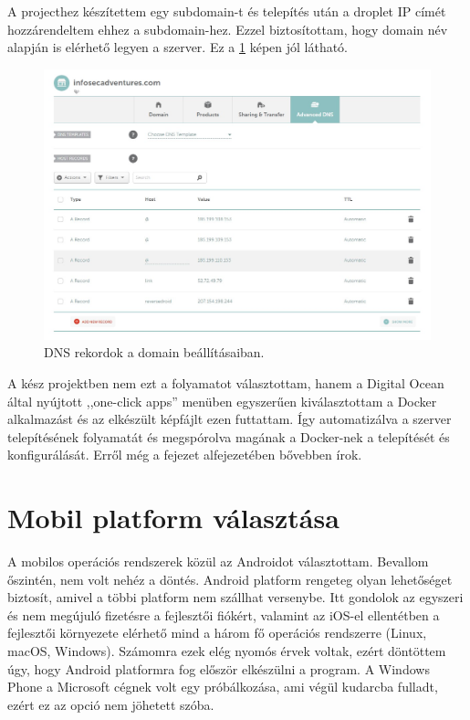 \documentclass{thesis-ekf}
\theoremstyle{definition}
\theoremstyle{remark}
\begin{document}
A projecthez készítettem egy subdomain-t és telepítés után a droplet IP címét hozzárendeltem ehhez a subdomain-hez.
Ezzel biztosítottam, hogy domain név alapján is elérhető legyen a szerver. Ez a \ref{namecheap} képen jól látható.

\begin{figure}[!h]
	\centering
	\includegraphics[width=15cm]{pictures/namecheap}
	\caption{DNS rekordok a domain beállításaiban.}
	\label{namecheap}
\end{figure}

A kész projektben nem ezt a folyamatot választottam, hanem a Digital Ocean által nyújtott ,,one-click apps'' menüben egyszerűen kiválasztottam a Docker alkalmazást és az elkészült képfájlt ezen futtattam. 
Így automatizálva a szerver telepítésének folyamatát és megspórolva magának a Docker-nek a telepítését és konfigurálását.
Erről még a  fejezet  alfejezetében bővebben írok.

\section{Mobil platform választása}

A mobilos operációs rendszerek közül az Androidot választottam. Bevallom őszintén, nem volt nehéz a döntés. 
Android platform rengeteg olyan lehetőséget biztosít, amivel a többi platform nem szállhat versenybe.
Itt gondolok az egyszeri és nem megújuló fizetésre a fejlesztői fiókért, valamint az iOS-el ellentétben a fejlesztői környezete elérhető mind a három fő operációs rendszerre (Linux, macOS, Windows).
Számomra ezek elég nyomós érvek voltak, ezért döntöttem úgy, hogy Android platformra fog először elkészülni a program.
A Windows Phone a Microsoft cégnek volt egy próbálkozása, ami végül kudarcba fulladt, ezért ez az opció nem jöhetett szóba.
\end{document}
